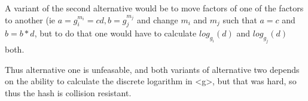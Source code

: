 \documentclass[a4paper,11pt]{article}
\begin{document}
		A variant of the second alternative would be to move factors of one of the factors to another (ie $a = g_i^{m_i} = cd, b = g_j^{m_j}$ and
		change $m_i$ and $m_j$ such that $a = c$ and $b = b*d$, but to do that one would have to calculate $log_{g_i}(d)$ and $log_{g_j}(d)$ both.

		Thus alternative one is unfeasable, and both variants of alternative two depends on the ability to calculate the discrete logarithm
		in <g>, but that was hard, so thus the hash is collision resistant.


			
\end{document}
